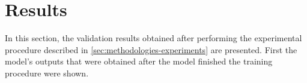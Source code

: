 \chapter{Results}
\label{chap:results}

In this section, the validation results obtained after performing the experimental procedure described in \autoref{sec:methodologies-experiments} are presented.
First the model's outputs that were obtained after the model finished the training procedure were shown.